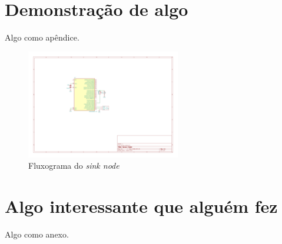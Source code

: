 \documentclass[oneside,openright,12pt]{ufsm_2015} %
\begin{document}
	
	
	
	\apendice %

\chapter{Demonstração de algo}
        \par Algo como apêndice.  
        \par \begin{figure}[ht]
 	    \caption{\label{exepretex} Fluxograma do \textit{sink node}}
        \centering
        \includegraphics[width=0.6\textwidth]{figuras/sensor_node_v2-1.png}
        \vspace{\baselineskip} %
\end{figure}

        
        
        
        \anexo    %
        
\chapter{Algo interessante que alguém fez}
         \par Algo como anexo.
         
\end{document}
